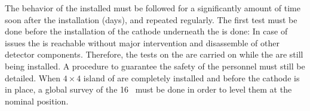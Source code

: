 The  behavior of the installed  must be followed for a significantly amount of time soon after the installation (days), and repeated regularly.
The first test must be done before the installation of the cathode underneath the  is done: In case of issues the  is reachable without major intervention and disassemble of other detector components.
Therefore, the  tests on the  are carried on while the  are still being installed.
A procedure to guarantee the safety of the personnel must still be detailed.
When $4 \times 4$ island of  are completely installed and before the cathode is in place, a global survey of the 16~ must be done in order to level them at the nominal position.



